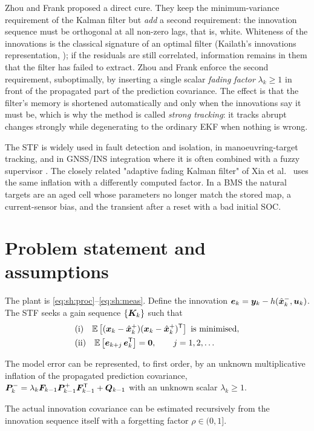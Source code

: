 Zhou and Frank \cite{zhoufrank1996stf} proposed a direct cure.  They keep the minimum-variance
requirement of the Kalman filter but \emph{add} a second requirement: the innovation sequence must
be orthogonal at all non-zero lags, that is, white.  Whiteness of the innovations is the classical
signature of an optimal filter (Kailath's innovations representation, \cite[Ch.~9]{kailath2000});
if the residuals are still correlated, information remains in them that the filter has failed to
extract.  Zhou and Frank enforce the second requirement, suboptimally, by inserting a single scalar
\emph{fading factor} $\lambda_k\ge 1$ in front of the propagated part of the prediction covariance.
The effect is that the filter's memory is shortened automatically and only when the innovations say
it must be, which is why the method is called \emph{strong tracking}: it tracks abrupt changes
strongly while degenerating to the ordinary EKF when nothing is wrong.

The STF is widely used in fault detection and isolation, in manoeuvring-target tracking, and in
GNSS/INS integration where it is often combined with a fuzzy supervisor \cite{jwo2007fuzzy}.  The
closely related "adaptive fading Kalman filter" of Xia et al.\ \cite{xia1994adaptive} uses the same
inflation with a differently computed factor.  In a BMS the natural targets are an aged cell whose
parameters no longer match the stored map, a current-sensor bias, and the transient after a reset
with a bad initial SOC.

\section{Problem statement and assumptions}
The plant is \eqref{eq:sh:proc}--\eqref{eq:sh:meas}.  Define the innovation
$\bm{e}_k=\bm{y}_k-h(\hat{\bm{x}}^{-}_k,\bm{u}_k)$.  The STF seeks a gain sequence $\{\bm{K}_k\}$ such that
\begin{align}
&\text{(i)}\quad \mathbb{E}\left[(\bm{x}_k-\hat{\bm{x}}^{+}_k)(\bm{x}_k-\hat{\bm{x}}^{+}_k)^{\mathsf{T}}\right] \ \text{is minimised}, \label{eq:stf:r1}\\
&\text{(ii)}\quad \mathbb{E}\left[\bm{e}_{k+j}\,\bm{e}_{k}^{\mathsf{T}}\right] = \bm 0, \qquad j = 1,2,\dots \label{eq:stf:r2}
\end{align}
\begin{assumption}\label{as:stf:mismatch}
The model error can be represented, to first order, by an unknown multiplicative inflation of the
propagated prediction covariance, $\bm{P}^{-}_k=\lambda_k\bm{F}_{k-1}\bm{P}^{+}_{k-1}\bm{F}_{k-1}^{\mathsf{T}}+\bm{Q}_{k-1}$
with an unknown scalar $\lambda_k\ge1$.
\end{assumption}
\begin{assumption}\label{as:stf:stat}
The actual innovation covariance can be estimated recursively from the innovation sequence itself
with a forgetting factor $\rho\in(0,1]$.
\end{assumption}

